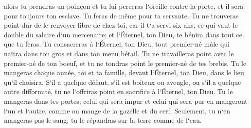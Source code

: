 \verse alors tu prendras un poinçon et tu lui perceras l`oreille contre la porte, et il sera pour toujours ton esclave. Tu feras de même pour ta servante. 
\verse Tu ne trouveras point dur de le renvoyer libre de chez toi, car il t`a servi six ans, ce qui vaut le double du salaire d`un mercenaire; et l`Éternel, ton Dieu, te bénira dans tout ce que tu feras. 
\verse Tu consacreras à l`Éternel, ton Dieu, tout premier-né mâle qui naîtra dans ton gros et dans ton menu bétail. Tu ne travailleras point avec le premier-né de ton boeuf, et tu ne tondras point le premier-né de tes brebis. 
\verse Tu le mangeras chaque année, toi et ta famille, devant l`Éternel, ton Dieu, dans le lieu qu`il choisira. 
\verse S`il a quelque défaut, s`il est boiteux ou aveugle, ou s`il a quelque autre difformité, tu ne l`offriras point en sacrifice à l`Éternel, ton Dieu. 
\verse Tu le mangeras dans tes portes; celui qui sera impur et celui qui sera pur en mangeront l`un et l`autre, comme on mange de la gazelle et du cerf. 
\verse Seulement, tu n`en mangeras pas le sang; tu le répandras sur la terre comme de l`eau. 


